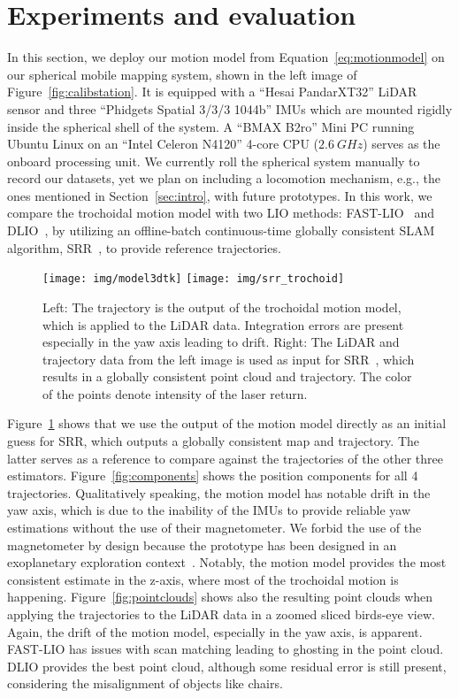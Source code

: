 \section{Experiments and evaluation}

In this section, we deploy our motion model from Equation~\eqref{eq:motionmodel} on our spherical mobile mapping system, shown in the left image of Figure~\ref{fig:calibstation}.
It is equipped with a ``Hesai PandarXT32'' LiDAR sensor and three ``Phidgets Spatial 3/3/3 1044b'' IMUs which are mounted rigidly inside the spherical shell of the system.
A ``BMAX B2ro'' Mini PC running Ubuntu Linux on an ``Intel Celeron N4120'' 4-core CPU ($\SI{2.6}{GHz}$) serves as the onboard processing unit. 
We currently roll the spherical system manually to record our datasets, yet we plan on including a locomotion mechanism, e.g., the ones mentioned in Section~\ref{sec:intro}, with future prototypes.
In this work, we compare the trochoidal motion model with two LIO methods: FAST-LIO~\cite{xu2022fast} and DLIO~\cite{10160508}, by utilizing an offline-batch continuous-time globally consistent SLAM algorithm, SRR~\cite{srr}, to provide reference trajectories.
\begin{figure}
  \centering
  \texttt{[image: img/model3dtk]}
  \texttt{[image: img/srr\_trochoid]}
  \caption{Left: The trajectory is the output of the trochoidal motion model, which is applied to the LiDAR data.
  Integration errors are present especially in the yaw axis leading to drift.
  Right: The LiDAR and trajectory data from the left image is used as input for SRR~\cite{srr}, which results in a globally consistent point cloud and trajectory.
  The color of the points denote intensity of the laser return.}
  \label{fig:srrtrochoid}
\end{figure}
Figure~\ref{fig:srrtrochoid} shows that we use the output of the motion model directly as an initial guess for SRR, which outputs a globally consistent map and trajectory.
The latter serves as a reference to compare against the trajectories of the other three estimators.
Figure~\ref{fig:components} shows the position components for all 4 trajectories.
Qualitatively speaking, the motion model has notable drift in the yaw axis, which is due to the inability of the IMUs to provide reliable yaw estimations without the use of their magnetometer.
We forbid the use of the magnetometer by design because the prototype has been designed in an exoplanetary exploration context~\cite{deadalus}.
Notably, the motion model provides the most consistent estimate in the z-axis, where most of the trochoidal motion is happening.
Figure~\ref{fig:pointclouds} shows also the resulting point clouds when applying the trajectories to the LiDAR data in a zoomed sliced birds-eye view.
Again, the drift of the motion model, especially in the yaw axis, is apparent.
FAST-LIO has issues with scan matching leading to ghosting in the point cloud.
DLIO provides the best point cloud, although some residual error is still present, considering the misalignment of objects like chairs.

